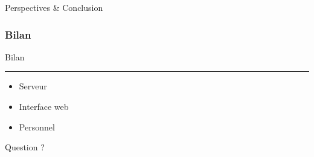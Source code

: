\documentclass[t, english]{beamer}
\begin{document}
\begin{frame}[c]
\par
\Huge Perspectives \& Conclusion
\end{frame}

\begin{frame}[c]
  \frametitle{Bilan}
  
  \begin{minipage}{1\textwidth}
  	
\begin {center}
	\par
	\Huge Bilan
\end{center}
             
    \end{minipage}
   
   \hrule
  
  \begin{minipage}{1\textwidth}
    
         \begin{itemize}
     	    \item <1-> Serveur
     	    \item <2-> Interface web
	    \item <3-> Personnel
         \end{itemize}
   \end{minipage}
\end{frame}

\begin{frame}[c]

\begin{center}

\par
\Huge Question ?

\end{center}
\end{frame}
\end{document}
